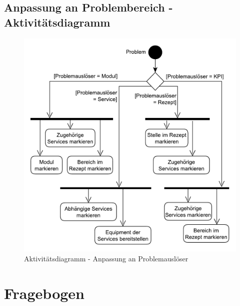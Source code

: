 \section{Anpassung an Problembereich - Aktivitätsdiagramm}
\begin{figure}[hb]
\centering
\includegraphics[scale=0.6]{DA_files/UML/Anhang/Aktivitaetsdiagramm-Problem.pdf}
\caption{Aktivitätsdiagramm - Anpassung an Problemauslöser}
\end{figure}

\chapter{Fragebogen}
\label{A:Fragebogen-Validierung}

